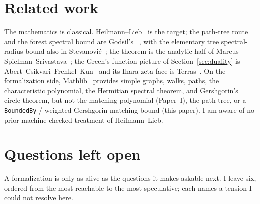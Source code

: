 \documentclass[11pt]{article}
\newcommand{\lean}[1]{{\def\_{\textunderscore\allowbreak}\texttt{#1}}}
\begin{document}
\section{Related work}
\label{sec:related}

The mathematics is classical. Heilmann--Lieb~\cite{HeilmannLieb1972} is the target;
the path-tree route and the forest spectral bound are Godsil's
~\cite{Godsil1981Matchings,Godsil1993}, with the elementary tree spectral-radius
bound also in Stevanovi\'c~\cite{Stevanovic2003}; the theorem is the analytic half
of Marcus--Spielman--Srivastava~\cite{MSS2015a}; the Green's-function picture of
Section~\ref{sec:duality} is Abert--Csikvari--Frenkel--Kun~\cite{AbertCsikvariFrenkelKun2016}
and its Ihara-zeta face is Terras~\cite{Terras2011}. On the formalization side,
Mathlib~\cite{Mathlib2020} provides simple graphs, walks, paths, the
characteristic polynomial, the Hermitian spectral theorem, and Gershgorin's circle
theorem, but not the matching polynomial (Paper~I), the path tree, or a
\lean{BoundedBy} / weighted-Gershgorin matching bound (this paper). I am aware of
no prior machine-checked treatment of Heilmann--Lieb.

\section{Questions left open}
\label{sec:open}

A formalization is only as alive as the questions it makes askable next. I leave
six, ordered from the most reachable to the most speculative; each names a tension
I could not resolve here.
\end{document}

